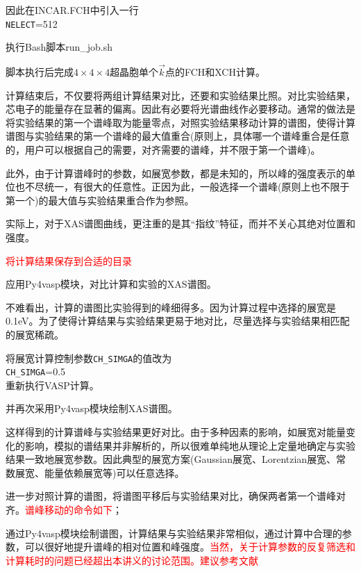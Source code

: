 因此在\textrm{INCAR.FCH}中引入一行\\
\texttt{NELECT}=512

执行\textrm{Bash}脚本\textrm{run\_job.sh}

脚本执行后完成$4\times4\times4$超晶胞单个$\vec k$点的\textrm{FCH}和\textrm{XCH}计算。

计算结束后，不仅要将两组计算结果对比，还要和实验结果比照。对比实验结果，芯电子的能量存在显著的偏离。因此有必要将光谱曲线作必要移动。通常的做法是将实验结果的第一个谱峰取为能量零点，对照实验结果移动计算的谱图，使得计算谱图与实验结果的第一个谱峰的最大值重合(原则上，具体哪一个谱峰重合是任意的，用户可以根据自己的需要，对齐需要的谱峰，并不限于第一个谱峰)。

此外，由于计算谱峰时的参数，如展宽参数，都是未知的，所以峰的强度表示的单位也不尽统一，有很大的任意性。正因为此，一般选择一个谱峰(原则上也不限于第一个)的最大值与实验结果重合作为参照。

实际上，对于\textrm{XAS}谱图曲线，更注重的是其``指纹''特征，而并不关心其绝对位置和强度。

\textcolor{red}{将计算结果保存到合适的目录}

应用\textrm{Py4vasp}模块，对比计算和实验的\textrm{XAS}谱图。

不难看出，计算的谱图比实验得到的峰细得多。因为计算过程中选择的展宽是\textrm{0.1eV}。为了使得计算结果与实验结果更易于地对比，尽量选择与实验结果相匹配的展宽稀疏。%

将展宽计算控制参数\texttt{CH\_SIMGA}的值改为\\
\texttt{CH\_SIMGA}=0.5\\
重新执行\textrm{VASP}计算。

并再次采用\textrm{Py4vasp}模块绘制\textrm{XAS}谱图。

这样得到的计算谱峰与实验结果更好对比。由于多种因素的影响，如展宽对能量变化的影响，模拟的谱结果并非解析的，所以很难单纯地从理论上定量地确定与实验结果一致地展宽参数。因此典型的展宽方案(\textrm{Gaussian}展宽、\textrm{Lorentzian}展宽、常数展宽、能量依赖展宽等)可以任意选择。%

进一步对照计算的谱图，将谱图平移后与实验结果对比，确保两者第一个谱峰对齐。\textcolor{red}{谱峰移动的命令如下}；

通过\textrm{Py4vasp}模块绘制谱图，计算结果与实验结果非常相似，通过计算中合理的参数，可以很好地提升谱峰的相对位置和峰强度。\textcolor{red}{当然，关于计算参数的反复筛选和计算耗时的问题已经超出本讲义的讨论范围。建议参考文献\cite{PRB106-155133_2022}}

